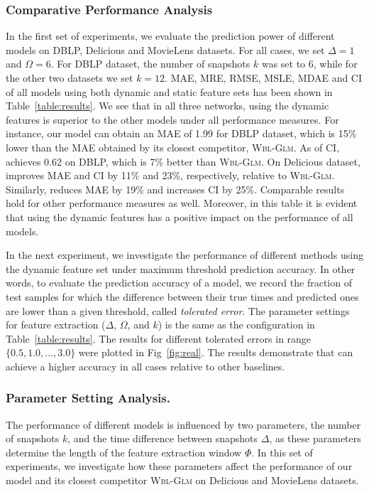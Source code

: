\subsubsection{Comparative Performance Analysis}
In the first set of experiments, we evaluate the prediction power of different models on DBLP, Delicious and MovieLens datasets. For all cases, we set $\Delta=1$ and $\Omega=6$. For DBLP dataset, the number of snapshots $k$ was set to 6, while for the other two datasets we set $k=12$. MAE, MRE, RMSE, MSLE, MDAE and CI of all models using both dynamic and static feature sets has been shown in Table~\ref{table:results}. We see that in all three networks, \npglm using the dynamic features is superior to the other models under all performance measures. For instance, our model \npglm can obtain an MAE of 1.99 for DBLP dataset, which is 15\% lower than the MAE obtained by its closest competitor, \textsc{Wbl-Glm}. As of CI, \npglm achieves 0.62 on DBLP, which is 7\% better than \textsc{Wbl-Glm}. 
On Delicious dataset, \npglm improves MAE and CI by 11\% and 23\%, respectively, relative to \textsc{Wbl-Glm}. Similarly, \npglm reduces MAE by 19\% and increases CI by 25\%. Comparable results hold for other performance measures as well. Moreover, in this table it is evident that using the dynamic features has a positive impact on the performance of all models.

In the next experiment, we investigate the performance of different methods using the dynamic feature set under maximum threshold prediction accuracy. In other words, to evaluate the prediction accuracy of a model, we record the fraction of test samples for which the difference between their true times and predicted ones are lower than a given threshold, called \emph{tolerated error}. The parameter settings for feature extraction ($\Delta$, $\Omega$, and $k$) is the same as the configuration in Table~\ref{table:results}. The results for different tolerated errors in range $\{0.5, 1.0, \dots, 3.0\}$ were plotted in Fig~\ref{fig:real}. The results demonstrate that \npglm can achieve a higher accuracy in all cases relative to other baselines.


\subsubsection{Parameter Setting Analysis.}
The performance of different models is influenced by two parameters, the number of snapshots $k$, and the time difference between snapshots $\Delta$, as these parameters determine the length of the feature extraction window $\Phi$. In this set of experiments, we investigate how these parameters affect the performance of our model \npglm and its closest competitor \textsc{Wbl-Glm} on Delicious and MovieLens datasets. 

